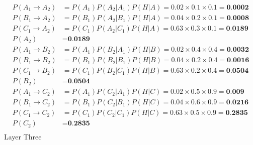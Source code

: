 \documentclass[a4paper]{article}
\begin{document}
\begin{align*}
     P(A_1 \rightarrow A_2) &= P(A_1) P(A_2 | A_1) P(H | A) = 0.02 \times 0.1 \times 0.1 = \textbf{0.0002}\\
     P(B_1 \rightarrow A_2) &= P(B_1) P(A_2 | B_1) P(H | A) = 0.04 \times 0.2 \times 0.1 = \textbf{0.0008}\\
     P(C_1 \rightarrow A_2) &= P(C_1) P(A_2 | C_1) P(H | A) = 0.63 \times 0.3 \times 0.1 = \textbf{0.0189}\\
     P(A_2) &= \textbf{0.0189} \\
     P(A_1 \rightarrow B_2) &= P(A_1) P(B_2 | A_1) P(H | B) = 0.02 \times 0.4 \times 0.4 = \textbf{0.0032}\\
     P(B_1 \rightarrow B_2) &= P(B_1) P(B_2 | B_1) P(H | B) = 0.04 \times 0.2 \times 0.4 = \textbf{0.0016}\\
     P(C_1 \rightarrow B_2) &= P(C_1) P(B_2 | C_1) P(H | B) = 0.63 \times 0.2 \times 0.4 = \textbf{0.0504} \\
     P(B_2) &= \textbf{0.0504} \\
     P(A_1 \rightarrow C_2) &= P(A_1) P(C_2 | A_1) P(H | C) = 0.02 \times 0.5 \times 0.9 = \textbf{0.009}\\
     P(B_1 \rightarrow C_2) &= P(B_1) P(C_2 | B_1 ) P(H | C) = 0.04 \times 0.6 \times 0.9 = \textbf{0.0216}\\
     P(C_1 \rightarrow C_2) &= P(C_1) P(C_2 | C_1) P(H | C) = 0.63 \times 0.5 \times 0.9 = \textbf{0.2835}\\
     P(C_2) &= \textbf{0.2835}\\
\end{align*}
Layer Three\\
\end{document}
